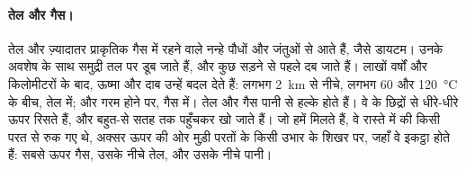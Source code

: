 \paragraph{तेल और गैस।} तेल और ज़्यादातर प्राकृतिक गैस  में रहने वाले नन्हे पौधों
और जंतुओं से आते हैं, जैसे डायटम। उनके अवशेष  के साथ समुद्री तल पर डूब जाते हैं, और
कुछ सड़ने से पहले दब जाते हैं। लाखों वर्षों और किलोमीटरों  के बाद, ऊष्मा और दाब उन्हें
बदल देते हैं: लगभग \qty{2}{km} से नीचे, लगभग 60 और \qty{120}{\degreeCelsius} के बीच,
तेल में; और गरम होने पर, गैस में। तेल और गैस पानी से हल्के होते हैं। वे   के
छिद्रों से धीरे-धीरे ऊपर रिसते हैं, और बहुत-से सतह तक पहुँचकर खो जाते हैं। जो हमें मिलते
हैं, वे रास्ते में   की किसी परत से रुक गए थे, अक्सर ऊपर की ओर मुड़ी परतों के
किसी उभार के शिखर पर, जहाँ वे इकट्ठा होते हैं: सबसे ऊपर गैस, उसके नीचे तेल, और उसके नीचे
पानी।

